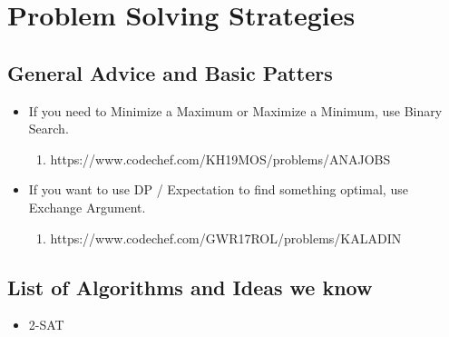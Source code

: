 \chapter{Problem Solving Strategies}


\section{General Advice and Basic Patters}

\begin{itemize}
    \item If you need to Minimize a Maximum or Maximize a Minimum, use Binary Search.
    \begin{enumerate}
        \item https://www.codechef.com/KH19MOS/problems/ANAJOBS
    \end{enumerate}
    \item If you want to use DP / Expectation to find something optimal, use Exchange Argument.
    \begin{enumerate}
        \item https://www.codechef.com/GWR17ROL/problems/KALADIN
    \end{enumerate}
\end{itemize}

\section{List of Algorithms and Ideas we know}

\begin{itemize}
    \item 2-SAT
\end{itemize}
